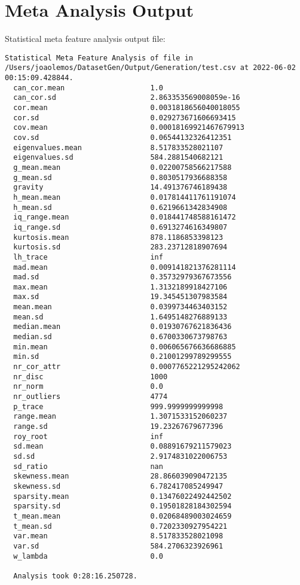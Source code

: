 \chapter{Meta Analysis Output} \label{ap2:meta_files}

Statistical meta feature analysis output file:
\begin{lstlisting}[breaklines=true, basicstyle=\footnotesize, tabsize=1]
  Statistical Meta Feature Analysis of file in /Users/joaolemos/DatasetGen/Output/Generation/test.csv at 2022-06-02 00:15:09.428844.
  can_cor.mean                    1.0
  can_cor.sd                      2.863353569008059e-16
  cor.mean                        0.0031818656040018055
  cor.sd                          0.029273671606693415
  cov.mean                        0.00018169921467679913
  cov.sd                          0.06544132326412351
  eigenvalues.mean                8.517833528021107
  eigenvalues.sd                  584.2881540682121
  g_mean.mean                     0.02200758566217588
  g_mean.sd                       0.8030517936688358
  gravity                         14.491376746189438
  h_mean.mean                     0.017814411761191074
  h_mean.sd                       0.6219661342834908
  iq_range.mean                   0.018441748588161472
  iq_range.sd                     0.6913274616349807
  kurtosis.mean                   878.1186853398123
  kurtosis.sd                     283.23712818907694
  lh_trace                        inf
  mad.mean                        0.009141821376281114
  mad.sd                          0.35732979367673556
  max.mean                        1.3132189918427106
  max.sd                          19.345451307983584
  mean.mean                       0.0399734463403152
  mean.sd                         1.6495148276889133
  median.mean                     0.01930767621836436
  median.sd                       0.6700330673798763
  min.mean                        0.006065676636686885
  min.sd                          0.21001299789299555
  nr_cor_attr                     0.0007765221295242062
  nr_disc                         1000
  nr_norm                         0.0
  nr_outliers                     4774
  p_trace                         999.9999999999998
  range.mean                      1.3071533152060237
  range.sd                        19.23267679677396
  roy_root                        inf
  sd.mean                         0.08891679211579023
  sd.sd                           2.9174831022006753
  sd_ratio                        nan
  skewness.mean                   28.866039090472135
  skewness.sd                     6.782417085249947
  sparsity.mean                   0.13476022492442502
  sparsity.sd                     0.19501828184302594
  t_mean.mean                     0.02068489003024659
  t_mean.sd                       0.7202330927954221
  var.mean                        8.517833528021098
  var.sd                          584.2706323926961
  w_lambda                        0.0
  
  Analysis took 0:28:16.250728.
  
\end{lstlisting}
